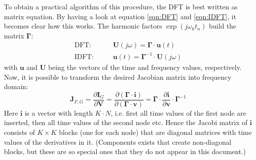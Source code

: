 To obtain a practical algorithm of this procedure, the DFT is best written
as matrix equation. By having a look at equation \ref{eqn:DFT} and
\ref{eqn:IDFT}, it becomes clear how this works. The harmonic factors
$\exp(j\omega_k t_n)$ build the matrix $\boldsymbol{\Gamma}$:
\begin{align}
\text{DFT:}  \qquad & \boldsymbol{U}(j\omega) = \boldsymbol{\Gamma}\cdot \boldsymbol{u}(t) \\
\text{IDFT:} \qquad & \boldsymbol{u}(t) = \boldsymbol{\Gamma}^{-1}\cdot \boldsymbol{U}(j\omega)
\end{align}
with $\boldsymbol{u}$ and $\boldsymbol{U}$ being the vectors of the time
and frequency values, respectively. Now, it is possible to transform the
desired Jacobian matrix into frequency domain:
\begin{equation}
\label{eqn:HB_jacobi}
\boldsymbol{J}_{F,G}
  = \frac{\partial\boldsymbol{I}_G}{\partial\boldsymbol{V}}
  = \frac{\partial(\boldsymbol{\Gamma}\cdot\boldsymbol{i})}
         {\partial(\boldsymbol{\Gamma}\cdot\boldsymbol{v})}
  = \boldsymbol{\Gamma}\cdot\frac{\partial\boldsymbol{i}}{\partial\boldsymbol{v}}
    \cdot\boldsymbol{\Gamma}^{-1}
\end{equation}
Here $\boldsymbol{i}$ is a vector with length $K\cdot N$, i.e. first all
time values of the first node are inserted, then all time values of the
second node etc. Hence the Jacobi matrix of $\boldsymbol{i}$ consists of
$K \times K$ blocks (one for each node) that are diagonal matrices with
time values of the derivatives in it. (Components exists that create
non-diagonal blocks, but these are so special ones that they do not appear
in this document.)

\addvspace{12pt}


